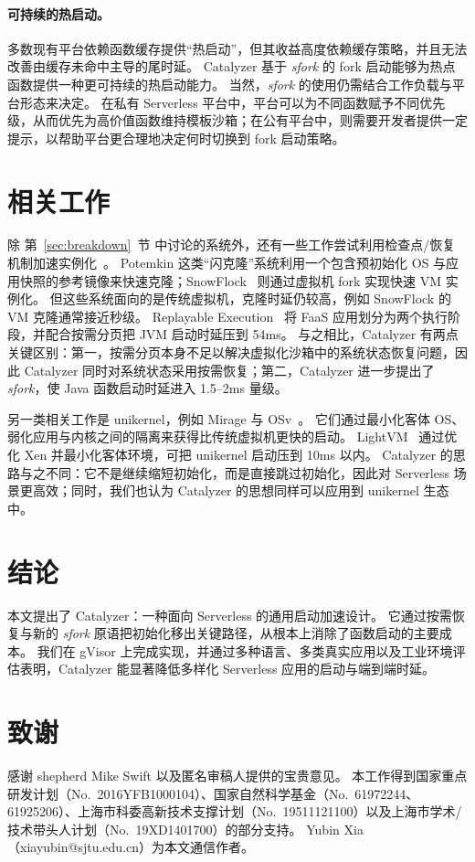 \documentclass[letterpaper,twocolumn,10pt]{article}
\newcommand{\sys}{Catalyzer}
\newcommand{\secref}[1]{第~\ref{#1}~节}
\newcommand{\para}[1]{\paragraph{#1}}
\begin{document}
\para{可持续的热启动。}
多数现有平台依赖函数缓存提供“热启动”，但其收益高度依赖缓存策略，并且无法改善由缓存未命中主导的尾时延。
\sys{} 基于 \emph{sfork} 的 fork 启动能够为热点函数提供一种更可持续的热启动能力。
当然，\emph{sfork} 的使用仍需结合工作负载与平台形态来决定。
在私有 Serverless 平台中，平台可以为不同函数赋予不同优先级，从而优先为高价值函数维持模板沙箱；在公有平台中，则需要开发者提供一定提示，以帮助平台更合理地决定何时切换到 fork 启动策略。

\section{相关工作}\label{sec:related}
除 \secref{sec:breakdown} 中讨论的系统外，还有一些工作尝试利用检查点/恢复机制加速实例化~\cite{r30,r42,r43}。
Potemkin 这类“闪克隆”系统利用一个包含预初始化 OS 与应用快照的参考镜像来快速克隆；SnowFlock~\cite{r30} 则通过虚拟机 fork 实现快速 VM 实例化。
但这些系统面向的是传统虚拟机，克隆时延仍较高，例如 SnowFlock 的 VM 克隆通常接近秒级。
Replayable Execution~\cite{r43} 将 FaaS 应用划分为两个执行阶段，并配合按需分页把 JVM 启动时延压到 54ms。
与之相比，\sys{} 有两点关键区别：第一，按需分页本身不足以解决虚拟化沙箱中的系统状态恢复问题，因此 \sys{} 同时对系统状态采用按需恢复；第二，\sys{} 进一步提出了 \emph{sfork}，使 Java 函数启动时延进入 1.5--2ms 量级。

另一类相关工作是 unikernel，例如 Mirage 与 OSv~\cite{r36,r26}。
它们通过最小化客体 OS、弱化应用与内核之间的隔离来获得比传统虚拟机更快的启动。
LightVM~\cite{r37} 通过优化 Xen 并最小化客体环境，可把 unikernel 启动压到 10ms 以内。
\sys{} 的思路与之不同：它不是继续缩短初始化，而是直接跳过初始化，因此对 Serverless 场景更高效；同时，我们也认为 \sys{} 的思想同样可以应用到 unikernel 生态中。

\section{结论}\label{sec:conclusion}
本文提出了 \sys{}：一种面向 Serverless 的通用启动加速设计。
它通过按需恢复与新的 \emph{sfork} 原语把初始化移出关键路径，从根本上消除了函数启动的主要成本。
我们在 gVisor 上完成实现，并通过多种语言、多类真实应用以及工业环境评估表明，\sys{} 能显著降低多样化 Serverless 应用的启动与端到端时延。

\section*{致谢}
感谢 shepherd Mike Swift 以及匿名审稿人提供的宝贵意见。
本工作得到国家重点研发计划（No.~2016YFB1000104）、国家自然科学基金（No.~61972244、61925206）、上海市科委高新技术支撑计划（No.~19511121100）以及上海市学术/技术带头人计划（No.~19XD1401700）的部分支持。
Yubin Xia（xiayubin@sjtu.edu.cn）为本文通信作者。

\small

\end{document}
